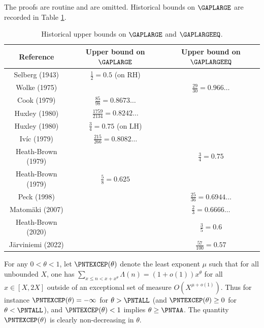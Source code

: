 The proofs are routine and are omitted.  Historical bounds on $\GAPLARGE$ are recorded in Table \ref{gaplarge-table}.

\begin{table}[ht]
    \caption{Historical upper bounds on $\GAPLARGE$ and $\GAPLARGEEQ$.}
    \label{gaplarge-table}
    \centering
    \renewcommand{\arraystretch}{1.2}
    \begin{tabular}{|c|c|c|}
    \hline
    Reference & Upper bound on $\GAPLARGE$ & Upper bound on $\GAPLARGEEQ$\\
    \hline
    Selberg (1943) \cite{selberg_1943} & $\frac{1}{2}=0.5$ (on RH) & \\
    \hline
    Wolke (1975) \cite{wolke_1975} & & $\frac{29}{30} = 0.966\dots$ \\
    \hline
    Cook (1979) \cite{cook_1979} & $\frac{85}{98} = 0.8673\dots$ & \\
    \hline
    Huxley (1980) \cite{huxley_large_1980} & $\frac{1759}{2134} = 0.8242\dots$ & \\
    \hline
    Huxley (1980) \cite{huxley_large_1980} & $\frac{3}{4} = 0.75$ (on LH) & \\
    \hline
    Iv\'ic (1979) \cite{ivic_sums_1979} & $\frac{215}{266} = 0.8082\dots$ & \\
    \hline
    Heath-Brown (1979) \cite{heath_brown_consecutive_III} & & $\frac{3}{4} = 0.75$ \\
    \hline
    Heath-Brown (1979) \cite{heath_brown_consecutive_II} & $\frac{5}{8} = 0.625$ & \\
    \hline
    Peck (1998) \cite{peck_differences_1998} & & $\frac{25}{36} = 0.6944\ldots$ \\
    \hline
    Matom\"{a}ki (2007) \cite{matomaki_large_2007} & & $\frac{2}{3} = 0.6666\ldots$ \\
    \hline
    Heath-Brown (2020) \cite{heath-brown_differences_2021} & & $\frac{3}{5} = 0.6$\\
    \hline
    J\"{a}rviniemi (2022) \cite{jarviniemi_large_2022} & & $\frac{57}{100} = 0.57$\\
    \hline
    \end{tabular}
\end{table}

For any $0 < \theta < 1$, let $\PNTEXCEP(\theta)$ denote the least exponent $\mu$ such that for all unbounded $X$, one has $\sum_{x \leq n < x + x^\theta} \Lambda(n) = (1+o(1)) x^\theta$ for all $x \in [X,2X]$ outside of an exceptional set of measure $O(X^{\mu+o(1)})$.  Thus for instance $\PNTEXCEP(\theta)=-\infty$ for $\theta > \PNTALL$ (and $\PNTEXCEP(\theta) \geq 0$ for $\theta < \PNTALL$), and $\PNTEXCEP(\theta) < 1$ implies $\theta \geq \PNTAA$. The quantity $\PNTEXCEP(\theta)$ is clearly non-decreasing in $\theta$.

